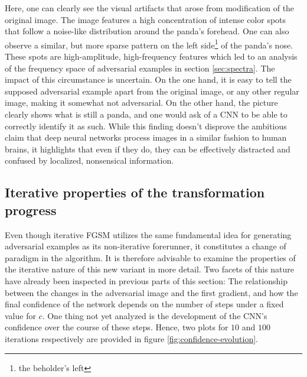 \documentclass[11pt, a4paper]{article}
\begin{document}
Here, one can clearly see the visual artifacts that arose from modification of the original image. The image features a high concentration of intense color spots that follow a noise-like distribution around the panda's forehead. One can also observe a similar, but more sparse pattern on the left side\footnote{the beholder's left} of the panda's nose. These spots are high-amplitude, high-frequency features which led to an analysis of the frequency space of adversarial examples in section \ref{sec:spectra}. The impact of this circumstance is uncertain. On the one hand, it is easy to tell the supposed adversarial example apart from the original image, or any other regular image, making it somewhat not adversarial. On the other hand, the picture clearly shows what is still a panda, and one would ask of a CNN to be able to correctly identify it as such. While this finding doesn't disprove the ambitious claim that deep neural networks process images in a similar fashion to human brains, it highlights that even if they do, they can be effectively distracted and confused by localized, nonsensical information.


\subsection{Iterative properties of the transformation progress}
Even though iterative FGSM utilizes the same fundamental idea for generating adversarial examples as its non-iterative forerunner, it constitutes a change of paradigm in the algorithm. It is therefore advisable to examine the properties of the iterative nature of this new variant in more detail. Two facets of this nature have already been inspected in previous parts of this section: The relationship between the changes in the adversarial image and the first gradient, and how the final confidence of the network depends on the number of steps under a fixed value for $c$. One thing not yet analyzed is the development of the CNN's confidence over the course of these steps. Hence, two plots for $10$ and $100$ iterations respectively are provided in figure \ref{fig:confidence-evolution}.
\end{document}
